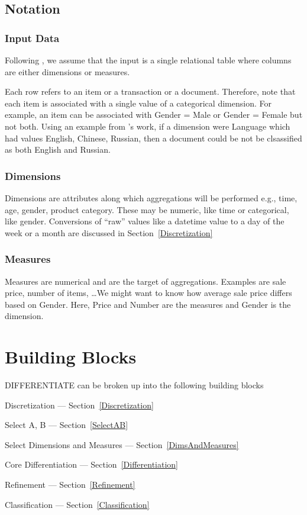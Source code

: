 \subsection{Notation}
\subsubsection{Input Data}
Following \cite{Fagin05}, we assume that the input is a 
single relational
table where columns are either dimensions or measures. 

Each row refers to an item or a transaction or a document. 
Therefore, note that each item is associated with a single value of a
categorical dimension. For example, an item can be associated with Gender = Male
or Gender = Female but not both.
Using an example from \cite{Fagin05}'s work, if a dimension were Language which had 
values English, Chinese, Russian, then a document could be not be clsassified as
both English and Russian.


\subsubsection{Dimensions}
Dimensions are
attributes along which aggregations will be performed e.g., time, age,
gender, product category. These may be numeric, like time or
categorical, like gender.
Conversions of ``raw'' values like a datetime value to a day of the week or a
month are discussed in Section~\ref{Discretization}

\subsubsection{Measures}
Measures are numerical and are the target of aggregations. Examples are sale
price, number of items, \ldots We might want to know how average sale price
differs based on Gender. Here, Price and Number are the measures and Gender is
the dimension.

\section{Building Blocks}
DIFFERENTIATE can be broken up into the following building blocks
\be
\item Discretization --- Section~\ref{Discretization}
\item Select A, B  --- Section~\ref{SelectAB}
\item Select Dimensions and Measures --- Section~\ref{DimsAndMeasures}
\item Core Differentiation  --- Section~\ref{Differentiation}
\item Refinement --- Section~\ref{Refinement}
\item Classification --- Section~\ref{Classification}
\ee


